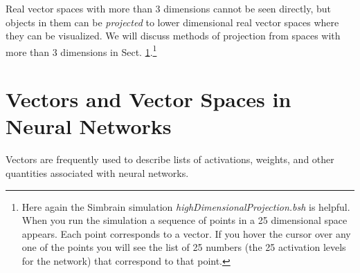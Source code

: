    Real vector spaces with more than 3 dimensions cannot be seen directly, but 
objects in them can be \emph{projected} to lower dimensional real vector spaces 
where they can be visualized. We will discuss methods of projection from 
spaces with more than 3 dimensions in Sect. \ref{S:dimReduction}.\footnote{Here
again the Simbrain simulation \emph{highDimensionalProjection.bsh} is helpful.
When you run the simulation a sequence of points in a 25 dimensional space 
appears. Each point corresponds to a vector. If you hover the cursor over any
one of the points you will see the list of 25 numbers (the 25 activation levels
for the network) that correspond to that point.}

\section{Vectors and Vector Spaces in Neural Networks}\label{S:dimReduction}

   Vectors are frequently used to describe lists of activations, weights, and other quantities associated with neural networks. 

